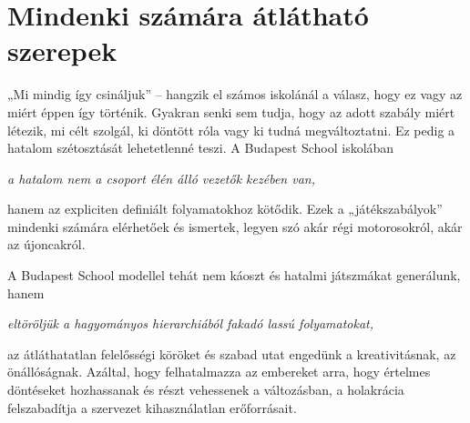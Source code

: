 \section{Mindenki számára átlátható szerepek}

„Mi mindig így csináljuk” – hangzik el számos iskolánál a válasz, hogy ez vagy az miért éppen így történik. Gyakran senki sem tudja, hogy az adott szabály miért létezik, mi célt szolgál, ki döntött róla vagy ki tudná megváltoztatni. Ez pedig a hatalom szétosztását lehetetlenné teszi. A Budapest School iskolában

\emph{a hatalom nem a csoport élén álló vezetők kezében van,}

hanem az expliciten definiált folyamatokhoz kötődik. Ezek a „játékszabályok” mindenki számára elérhetőek és ismertek, legyen szó akár régi motorosokról, akár az újoncakról.

A Budapest School modellel tehát nem káoszt és hatalmi játszmákat generálunk, hanem

\emph{eltöröljük a hagyományos hierarchiából fakadó lassú folyamatokat,}

az átláthatatlan felelősségi köröket és szabad utat engedünk a kreativitásnak, az önállóságnak. Azáltal, hogy felhatalmazza az embereket arra, hogy értelmes döntéseket hozhassanak és részt vehessenek a változásban, a holakrácia felszabadítja a szervezet kihasználatlan erőforrásait.


